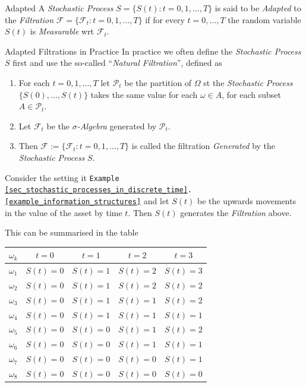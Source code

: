 \documentclass[11pt,a4paper]{article}
\begin{document}
  \begin{definition}{Adapted}
    A \textit{Stochastic Process} $S=\{S(t):t=0,1,\dots,T\}$ is said to be \textit{Adapted} to the \textit{Filtration} $\mathcal{F}=\{\mathcal{F}_t:t=0,1,\dots,T\}$ if for every $t=0,\dots,T$ the random variable $S(t)$ is \textit{Measurable} wrt $\mathcal{F}_t$.
  \end{definition}

  \begin{remark}{Adapted Filtrations in Practice}
    In practice we often define the \textit{Stochastic Process} $S$ first and use the so-called ``\textit{Natural Filtration}'', defined as
    \begin{enumerate}
      \item For each $t=0,1,\dots,T$ let $\mathcal{P}_t$ be the partition of $\Omega$ st the \textit{Stochastic Process} $\{S(0),\dots,S(t)\}$ takes the same value for each $\omega\in A$, for each subset $A\in\mathcal{P}_t$.
      \item Let $\mathcal{F}_t$ be the \textit{$\sigma$-Algebra} generated by $\mathcal{P}_t$.
      \item Then $\mathcal{F}:=\{\mathcal{F}_t:t=0,1,\dots,T\}$ is called the filtration \textit{Generated} by the \textit{Stochastic Process} $S$.
    \end{enumerate}
  \end{remark}

  \begin{example}{}
    Consider the setting it \texttt{Example \ref{sec_stochastic_processes_in_discrete_time}.\ref{example_information_structures}} and let $S(t)$ be the upwards movements in the value of the asset by time $t$. Then $S(t)$ generates the \textit{Filtration} above.
    \par This can be summarised in the table
    \begin{center}
      \begin{tabular}{c|cccc}
        $\omega_k$&$t=0$&$t=1$&$t=2$&$t=3$\\\hline
        $\omega_1$&$S(t)=0$&$S(t)=1$&$S(t)=2$&$S(t)=3$\\
        $\omega_2$&$S(t)=0$&$S(t)=1$&$S(t)=2$&$S(t)=2$\\
        $\omega_3$&$S(t)=0$&$S(t)=1$&$S(t)=1$&$S(t)=2$\\
        $\omega_4$&$S(t)=0$&$S(t)=1$&$S(t)=1$&$S(t)=1$\\
        $\omega_5$&$S(t)=0$&$S(t)=0$&$S(t)=1$&$S(t)=2$\\
        $\omega_6$&$S(t)=0$&$S(t)=0$&$S(t)=1$&$S(t)=1$\\
        $\omega_7$&$S(t)=0$&$S(t)=0$&$S(t)=0$&$S(t)=1$\\
        $\omega_8$&$S(t)=0$&$S(t)=0$&$S(t)=0$&$S(t)=0$
      \end{tabular}
    \end{center}
  \end{example}
\end{document}

